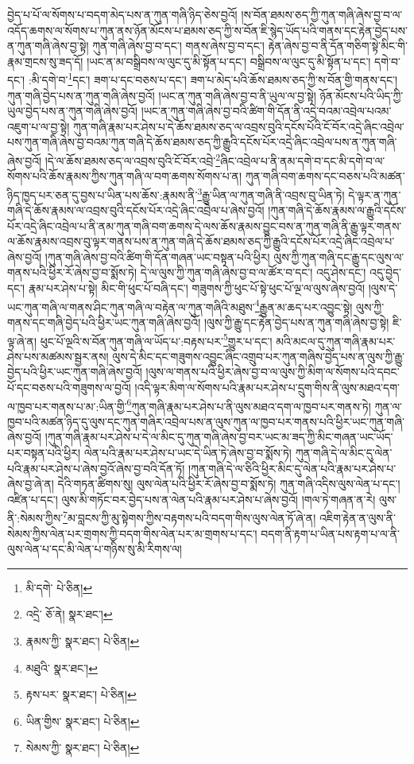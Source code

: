 བྱེད་པ་པོ་ལ་སོགས་པ་བདག་མེད་པས་ན་ཀུན་གཞི་ཉིད་ཅེས་བྱའོ། །ས་བོན་ཐམས་ཅད་ཀྱི་ཀུན་གཞི་ཞེས་བྱ་བ་ལ་འདོད་ཆགས་ལ་སོགས་པ་ཀུན་ནས་ཉོན་མོངས་པ་ཐམས་ཅད་ཀྱི་ས་བོན་ཇི་སྙེད་ཡོད་པའི་གནས་དང་རྟེན་བྱེད་པས་ན་ཀུན་གཞི་ཞེས་བྱ་སྟེ། ཀུན་གཞི་ཞེས་བྱ་བ་དང་། གནས་ཞེས་བྱ་བ་དང་། རྟེན་ཞེས་བྱ་བ་ནི་དོན་གཅིག་སྟེ་མིང་གི་རྣམ་གྲངས་སུ་ཟད་དོ། །ཡང་ན་མ་བསྒྲིབས་ལ་ལུང་དུ་མི་སྟོན་པ་དང་། བསྒྲིབས་ལ་ལུང་དུ་མི་སྟོན་པ་དང་། དགེ་བ་དང་། :མི་དགེ་བ་\footnote{མི་དགེ་  པེ་ཅིན། }དང་། ཟག་པ་དང་བཅས་པ་དང་། ཟག་པ་མེད་པའི་ཆོས་ཐམས་ཅད་ཀྱི་ས་བོན་གྱི་གནས་དང་། ཀུན་གཞི་བྱེད་པས་ན་ཀུན་གཞི་ཞེས་བྱའོ། །ཡང་ན་ཀུན་གཞི་ཞེས་བྱ་བ་ནི་ཡུལ་ལ་བྱ་སྟེ། ཉོན་མོངས་པའི་ཡིད་ཀྱི་ཡུལ་བྱེད་པས་ན་ཀུན་གཞི་ཞེས་བྱའོ། །ཡང་ན་ཀུན་གཞི་ཞེས་བྱ་བའི་ཚིག་གི་དོན་ནི་འདྲེ་བའམ་འབྲེལ་པའམ་འཇུག་པ་ལ་བྱ་སྟེ། ཀུན་གཞི་རྣམ་པར་ཤེས་པ་དེ་ཆོས་ཐམས་ཅད་ལ་འབྲས་བུའི་དངོས་པོའི་ངོ་བོར་འདྲེ་ཞིང་འབྲེལ་པས་ཀུན་གཞི་ཞེས་བྱ་བའམ་ཀུན་གཞི་དེ་ཆོས་ཐམས་ཅད་ཀྱི་རྒྱུའི་དངོས་པོར་འདྲེ་ཞིང་འབྲེལ་པས་ན་ཀུན་གཞི་ཞེས་བྱའོ། །དེ་ལ་ཆོས་ཐམས་ཅད་ལ་འབྲས་བུའི་ངོ་བོར་འབྲེ་\footnote{འདྲེ་  ཅོ་ནེ།  སྣར་ཐང་། }ཞིང་འབྲེལ་པ་ནི་ནམ་དགེ་བ་དང་མི་དགེ་བ་ལ་སོགས་པའི་ཆོས་རྣམས་ཀྱིས་ཀུན་གཞི་ལ་བག་ཆགས་སོགས་པ་ན། ཀུན་གཞི་བག་ཆགས་དང་བཅས་པའི་མཚན་ཉིད་ཁྱད་པར་ཅན་དུ་བྱས་པ་ཡིན་པས་ཆོས་:རྣམས་ནི་\footnote{རྣམས་ཀྱི་  སྣར་ཐང་།  པེ་ཅིན། }རྒྱུ་ཡིན་ལ་ཀུན་གཞི་ནི་འབྲས་བུ་ཡིན་ཏེ། དེ་ལྟར་ན་ཀུན་གཞི་དེ་ཆོས་རྣམས་ལ་འབྲས་བུའི་དངོས་པོར་འདྲེ་ཞིང་འབྲེལ་པ་ཞེས་བྱའོ། །ཀུན་གཞི་དེ་ཆོས་རྣམས་ལ་རྒྱུའི་དངོས་པོར་འདྲེ་ཞིང་འབྲེལ་པ་ནི་ནམ་ཀུན་གཞི་བག་ཆགས་དེ་ལས་ཆོས་རྣམས་བྱུང་བས་ན་ཀུན་གཞི་ནི་རྒྱུ་ལྟར་གནས་ལ་ཆོས་རྣམས་འབྲས་བུ་ལྟར་གནས་པས་ན་ཀུན་གཞི་དེ་ཆོས་ཐམས་ཅད་ཀྱི་རྒྱུའི་དངོས་པོར་འདྲེ་ཞིང་འབྲེལ་པ་ཞེས་བྱའོ། །ཀུན་གཞི་ཞེས་བྱ་བའི་ཚིག་གི་དོན་གཞན་ཡང་བསྟན་པའི་ཕྱིར། ལུས་ཀྱི་ཀུན་གཞི་དང་རྒྱུ་དང་ལུས་ལ་གནས་པའི་ཕྱིར་རོ་ཞེས་བྱ་བ་སྨོས་ཏེ། དེ་ལ་ལུས་ཀྱི་ཀུན་གཞི་ཞེས་བྱ་བ་ལ་ཚོར་བ་དང་། འདུ་ཤེས་དང་། འདུ་བྱེད་དང་། རྣམ་པར་ཤེས་པ་སྟེ། མིང་གི་ཕུང་པོ་བཞི་དང་། གཟུགས་ཀྱི་ཕུང་པོ་སྟེ་ཕུང་པོ་ལྔ་ལ་ལུས་ཞེས་བྱའོ། །ལུས་དེ་ཡང་ཀུན་གཞི་ལ་གནས་ཤིང་ཀུན་གཞི་ལ་བརྟེན་ལ་ཀུན་གཞིའི་མཐུས་\footnote{མཐུའི་  སྣར་ཐང་། }རྒྱུན་མ་ཆད་པར་འབྱུང་སྟེ། ལུས་ཀྱི་གནས་དང་གཞི་བྱེད་པའི་ཕྱིར་ཡང་ཀུན་གཞི་ཞེས་བྱའོ། །ལུས་ཀྱི་རྒྱུ་དང་རྟེན་བྱེད་པས་ན་ཀུན་གཞི་ཞེས་བྱ་སྟེ། ཇི་ལྟ་ཞེ་ན། ཕུང་པོ་ལྔའི་ས་བོན་ཀུན་གཞི་ལ་ཡོད་པ་:བརྟས་པར་\footnote{རྟས་པར་  སྣར་ཐང་།  པེ་ཅིན། }གྱུར་པ་དང་། མའི་མངལ་དུ་ཀུན་གཞི་རྣམ་པར་ཤེས་པས་མཚམས་སྦྱར་ནས། ལུས་དེ་མིང་དང་གཟུགས་འབྱུང་ཞིང་འགྲུབ་པར་ཀུན་གཞིས་བྱེད་པས་ན་ལུས་ཀྱི་རྒྱུ་བྱེད་པའི་ཕྱིར་ཡང་ཀུན་གཞི་ཞེས་བྱའོ། །ལུས་ལ་གནས་པའི་ཕྱིར་ཞེས་བྱ་བ་ལ་ལུས་ཀྱི་མིག་ལ་སོགས་པའི་དབང་པོ་དང་བཅས་པའི་གཟུགས་ལ་བྱའོ། །འདི་ལྟར་མིག་ལ་སོགས་པའི་རྣམ་པར་ཤེས་པ་དྲུག་གིས་ནི་ལུས་མཐའ་དག་ལ་ཁྱབ་པར་གནས་པ་མ་:ཡིན་གྱི་\footnote{ཡིན་གྱིས་  སྣར་ཐང་།  པེ་ཅིན། }ཀུན་གཞི་རྣམ་པར་ཤེས་པ་ནི་ལུས་མཐའ་དག་ལ་ཁྱབ་པར་གནས་ཏེ། ཀུན་ལ་ཁྱབ་པའི་མཚན་ཉིད་དུ་ལུས་དང་ཀུན་གཞིར་འབྲེལ་པས་ན་ལུས་ཀུན་ལ་ཁྱབ་པར་གནས་པའི་ཕྱིར་ཡང་ཀུན་གཞི་ཞེས་བྱའོ། །ཀུན་གཞི་རྣམ་པར་ཤེས་པ་དེ་ལ་མིང་དུ་ཀུན་གཞི་ཞེས་བྱ་བར་ཡང་མ་ཟད་ཀྱི་མིང་གཞན་ཡང་ཡོད་པར་བསྟན་པའི་ཕྱིར། ལེན་པའི་རྣམ་པར་ཤེས་པ་ཡང་དེ་ཡིན་ཏེ་ཞེས་བྱ་བ་སྨོས་ཏེ། ཀུན་གཞི་དེ་ལ་མིང་དུ་ལེན་པའི་རྣམ་པར་ཤེས་པ་ཞེས་བྱའོ་ཞེས་བྱ་བའི་དོན་ཏོ། །ཀུན་གཞི་དེ་ལ་ཅིའི་ཕྱིར་མིང་དུ་ལེན་པའི་རྣམ་པར་ཤེས་པ་ཞེས་བྱ་ཞེ་ན། དེའི་གཏན་ཚིགས་སུ། ལུས་ལེན་པའི་ཕྱིར་རོ་ཞེས་བྱ་བ་སྨོས་ཏེ། ཀུན་གཞི་འདིས་ལུས་ལེན་པ་དང་། འཛིན་པ་དང་། ལུས་མི་གཏོང་བར་བྱེད་པས་ན་ལེན་པའི་རྣམ་པར་ཤེས་པ་ཞེས་བྱའོ། །གལ་ཏེ་གཞན་ན་རེ། ལུས་ནི་:སེམས་ཀྱིས་\footnote{སེམས་ཀྱི་  སྣར་ཐང་།  པེ་ཅིན། }མ་བླངས་ཀྱི་མུ་སྟེགས་ཀྱིས་བརྟགས་པའི་བདག་གིས་ལུས་ལེན་ཏོ་ཞེ་ན། འཇིག་རྟེན་ན་ལུས་ནི་སེམས་ཀྱིས་ལེན་པར་གྲགས་ཀྱི་བདག་གིས་ལེན་པར་མ་གྲགས་པ་དང་། བདག་ནི་རྟག་པ་ཡིན་པས་རྟག་པ་ལ་ནི་ལུས་ལེན་པ་དང་མི་ལེན་པ་གཉིས་སུ་མི་རིགས་ལ། 